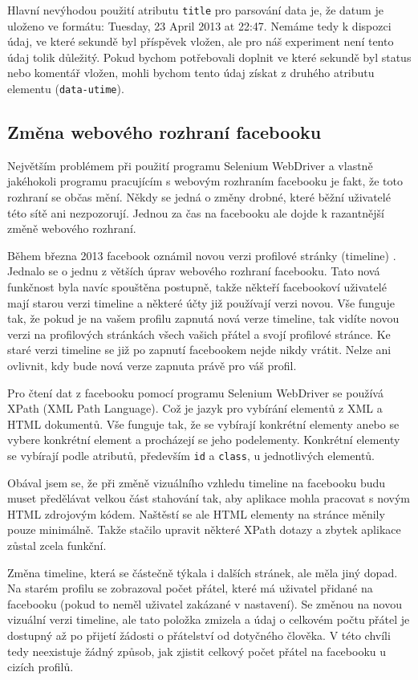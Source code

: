 \documentclass[thesis=M,czech]{FITthesis}[2013/05/10]
\begin{document}
Hlavní nevýhodou použití atributu \verb|title| pro parsování data je, že datum je uloženo ve formátu: Tuesday, 23 April 2013 at 22:47. Nemáme tedy k dispozci údaj, ve které sekundě byl příspěvek vložen, ale pro náš experiment není tento údaj tolik důležitý. Pokud bychom potřebovali doplnit ve které sekundě byl status nebo komentář vložen, mohli bychom tento údaj získat z druhého atributu elementu (\verb|data-utime|). 

\subsection{Změna webového rozhraní facebooku}

Největším problémem při použití programu Selenium WebDriver a vlastně jakéhokoli programu pracujícím s webovým rozhraním facebooku je fakt, že toto rozhraní se občas mění. Někdy se jedná o změny drobné, které běžní uživatelé této sítě ani nezpozorují. Jednou za čas na facebooku ale dojde k razantnější změně webového rozhraní.

Během března 2013 facebook oznámil novou verzi profilové stránky (timeline) \cite{fbTimelineImprovements}. Jednalo se o jednu z větších úprav webového rozhraní facebooku. Tato nová funkčnost byla navíc spouštěna postupně, takže někteří facebookoví uživatelé mají starou verzi timeline a některé účty již používají verzi novou. Vše funguje tak, že pokud je na vašem profilu zapnutá nová verze timeline, tak vidíte novou verzi na profilových stránkách všech vašich přátel a svojí profilové stránce. Ke staré verzi timeline se již po zapnutí facebookem nejde nikdy vrátit. Nelze ani ovlivnit, kdy bude nová verze zapnuta právě pro váš profil.

Pro čtení dat z facebooku pomocí programu Selenium WebDriver se používá XPath (XML Path Language). Což je jazyk pro vybírání elementů z XML a HTML dokumentů. Vše funguje tak, že se vybírají konkrétní elementy anebo se vybere konkrétní element a procházejí se jeho podelementy. Konkrétní elementy se vybírají podle atributů, především \verb|id| a \verb|class|, u jednotlivých elementů.

Obával jsem se, že při změně vizuálního vzhledu timeline na facebooku budu muset předělávat velkou část stahování tak, aby aplikace mohla pracovat s novým HTML zdrojovým kódem. Naštěstí se ale HTML elementy na stránce měnily pouze minimálně. Takže stačilo upravit některé XPath dotazy a zbytek aplikace zůstal zcela funkční.

Změna timeline, která se částečně týkala i dalších stránek, ale měla jiný dopad. Na starém profilu se zobrazoval počet přátel, které má uživatel přidané na facebooku (pokud to neměl uživatel zakázané v nastavení). Se změnou na novou vizuální verzi timeline, ale tato položka zmizela a údaj o celkovém počtu přátel je dostupný až po přijetí žádosti o přátelství od dotyčného člověka. V této chvíli tedy neexistuje žádný způsob, jak zjistit celkový počet přátel na facebooku u cizích profilů. 
\end{document}
